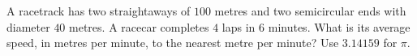 A racetrack has two straightaways of $100$ metres and two semicircular ends with diameter $40$ metres. A racecar completes $4$ laps in $6$ minutes. What is its average speed, in metres per minute, to the nearest metre per minute? Use $3.14159$ for $\pi$.
